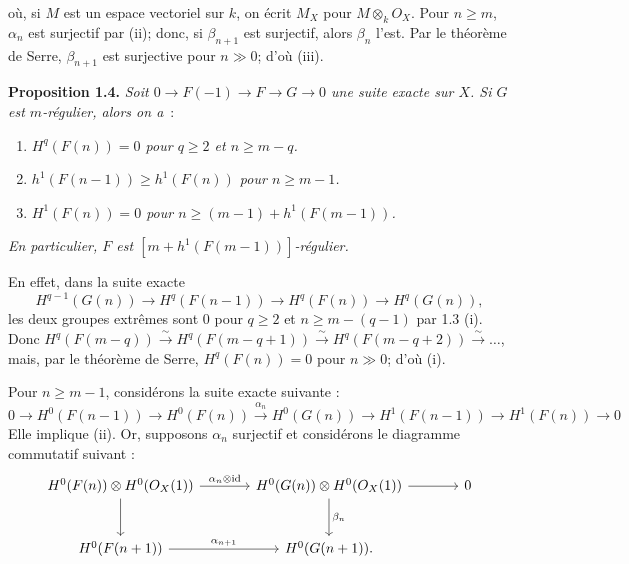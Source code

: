 
où, si \(M\) est un
espace vectoriel sur \(k\), on écrit \(M_X\) pour \(M\otimes_k{O}_X\). Pour \(n\ge m\), \(\alpha_n\) est surjectif par (ii); donc, si \(\beta_{n+1}\) est surjectif, alors \(\beta_n\) l'est. Par le théorème de Serre, \(\beta_{n+1}\) est surjective pour \(n\gg0\); d'où (iii).

\textbf{Proposition 1.4.} \emph{Soit \(0\to F(-1)\to F\to G\to0\) une suite exacte sur \(X\). Si \(G\) est \(m\)-régulier, alors on a}~:
\begin{enumerate}[label=(\roman*)]
\item \emph{\(H^q(F(n))=0\) pour \(q\ge2\) et \(n\ge m-q\).}
\item \emph{\(h^1(F(n-1))\ge h^1(F(n))\) pour \(n\ge m-1\).}
\item \emph{\(H^1(F(n))=0\) pour \(n\ge (m-1)+h^1(F(m-1))\).}
\end{enumerate}
\emph{En particulier, \(F\) est \([m+h^1(F(m-1))]\)-régulier.}

En effet, dans la suite exacte
\[
H^{q-1}(G(n))\longrightarrow H^q(F(n-1))\longrightarrow H^q(F(n))\longrightarrow H^q(G(n)),
\]
les deux groupes extrêmes sont \(0\) pour \(q\ge2\) et \(n\ge m-(q-1)\) par 1.3 (i). Donc \(H^q(F(m-q))\xrightarrow{\sim}H^q(F(m-q+1))\xrightarrow{\sim}H^q(F(m-q+2))\xrightarrow{\sim}\ldots\), mais, par le théorème de Serre, \(H^q(F(n))=0\) pour \(n\gg0\); d'où (i).

Pour \(n\ge m-1\), considérons la suite exacte suivante :
\[
0\to H^0(F(n-1))\to H^0(F(n))
  \xrightarrow{\alpha_n}H^0(G(n))\to H^1(F(n-1))
  \to H^1(F(n))\to0
\]
Elle implique (ii). Or, supposons \(\alpha_n\) surjectif et considérons le diagramme commutatif suivant :
\[
\begin{tikzcd}[column sep=large,row sep=large]
H^0(F(n))\otimes H^0({O}_X(1))
  \arrow[r,"\alpha_n\otimes\mathrm{id}"]
  \arrow[d]
& H^0(G(n))\otimes H^0({O}_X(1))
  \arrow[r]
  \arrow[d,"\beta_n"]
& 0 \\
H^0(F(n+1))
  \arrow[r,"\alpha_{n+1}"]
& H^0(G(n+1)).
\end{tikzcd}
\]
